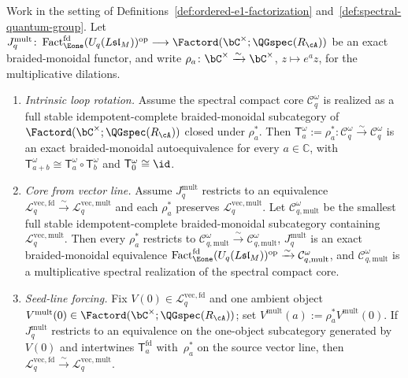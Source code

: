\begin{proposition}
\label{prop:yangian-dk5-spectral-factorization-shifts}%
\label{prop:yangian-dk5-spectral-factorization-core-from-vector-line}%
\label{prop:yangian-dk5-spectral-factorization-seed-line}%
Work in the setting of
Definitions~\ref{def:ordered-e1-factorization}
and~\ref{def:spectral-quantum-group}. Let
\(J_q^{\mathrm{mult}}\colon
\operatorname{Fact}_{\Eone}^{\mathrm{fd}}(U_q(L\mathfrak{sl}_M))^{\mathrm{op}}
\longrightarrow
\Factord(\bC^\times;\QGspec(R_{\cA}))\)
be an exact braided-monoidal functor, and write
\(\rho_a\colon \bC^\times\xrightarrow{\sim}\bC^\times\),
\(z\mapsto e^a z\), for the multiplicative dilations.
\begin{enumerate}[label=\textup{(\alph*)}]
\item\emph{Intrinsic loop rotation.}
 Assume the spectral compact core \(\mathcal{C}_q^\omega\) is
 realized as a full stable idempotent-complete braided-monoidal
 subcategory of
 \(\Factord(\bC^\times;\QGspec(R_{\cA}))\) closed under
 \(\rho_a^*\). Then
 \(\mathsf T_a^\omega:=\rho_a^*\colon
 \mathcal C_q^\omega\xrightarrow{\sim}\mathcal C_q^\omega\)
 is an exact braided-monoidal autoequivalence for every
 \(a\in\mathbb C\), with
 \(\mathsf T_{a+b}^\omega\cong
 \mathsf T_a^\omega\circ \mathsf T_b^\omega\) and
 \(\mathsf T_0^\omega\cong \id\).

\item\emph{Core from vector line.}
 Assume \(J_q^{\mathrm{mult}}\) restricts to an equivalence
 \(\mathcal L_q^{\mathrm{vec,fd}}
 \xrightarrow{\sim}
 \mathcal L_q^{\mathrm{vec,mult}}\)
 and each \(\rho_a^*\) preserves
 \(\mathcal L_q^{\mathrm{vec,mult}}\). Let
 \(\mathcal C_{q,\mathrm{mult}}^\omega\) be the smallest full stable
 idempotent-complete braided-monoidal subcategory containing
 \(\mathcal L_q^{\mathrm{vec,mult}}\). Then every \(\rho_a^*\)
 restricts to
 \(\mathcal C_{q,\mathrm{mult}}^\omega\xrightarrow{\sim}
 \mathcal C_{q,\mathrm{mult}}^\omega\),
 \(J_q^{\mathrm{mult}}\) is an exact braided-monoidal equivalence
 \(\operatorname{Fact}_{\Eone}^{\mathrm{fd}}(U_q(L\mathfrak{sl}_M))^{\mathrm{op}}
 \xrightarrow{\sim}
 \mathcal C_{q,\mathrm{mult}}^\omega\),
 and \(\mathcal C_{q,\mathrm{mult}}^\omega\) is a multiplicative
 spectral realization of the spectral compact core.

\item\emph{Seed-line forcing.}
 Fix $V(0)\in \mathcal L_q^{\mathrm{vec,fd}}$ and one ambient
 object
 $V^{\mathrm{mult}}(0)\in
 \Factord(\bC^\times;\allowbreak\QGspec(R_{\cA}))$;
 set
 $V^{\mathrm{mult}}(a):=\rho_a^*V^{\mathrm{mult}}(0)$.
 If $J_q^{\mathrm{mult}}$ restricts to an equivalence on the
 one-object subcategory generated by~$V(0)$ and intertwines
 $\mathsf T_a^{\mathrm{fd}}$ with~$\rho_a^*$ on the source
 vector line, then
 $\mathcal L_q^{\mathrm{vec,fd}}
 \xrightarrow{\sim}
 \mathcal L_q^{\mathrm{vec,mult}}$.
\end{enumerate}
\end{proposition}

